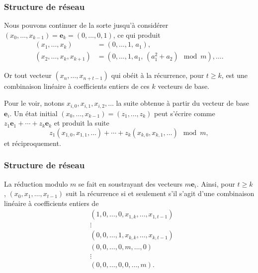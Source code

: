 \documentclass[t,usepdftitle=false]{beamer}
\def\be{\boldsymbol{e}}
\begin{document}
\begin{frame}
\frametitle{Structure de réseau}

Nous pouvons continuer de la sorte jusqu'à considérer
{$(x_0,\dots,x_{k-1}) = \be_k = (0,\dots,0,1)$}, ce qui produit
\begin{align*}
 (x_1,\dots,x_k) &= (0,\dots,1,\,a_1), \\ 
 (x_2,\dots,x_k, x_{k+1}) &= (0,\dots, 1, a_1,\, (a_1^2 + a_2)\mod m), \ldots.
 \end{align*}

\mbox{}

Or tout vecteur $(x_n,\dots,x_{n+t-1})$ qui obéit à la récurrence, 
pour $t\ge k$, est une combinaison linéaire à coefficients entiers de ces $k$ vecteurs de base.


\mbox{}

Pour le voir, notons ${x_{i,0}, x_{i,1}, x_{i,2},\dots}$ la suite
obtenue à partir du vecteur de base $\be_i$.
Un état initial $(x_0,\dots,x_{k-1}) = (z_1,\dots,z_k)$ peut
s'écrire comme $z_1 \be_1 + \cdots + z_k \be_k$ et produit la suite
\[
z_1 (x_{1,0}, x_{1,1}, \dots) + \cdots + 
 z_k (x_{k,0}, x_{k,1}, \dots) \mod m,
\]
et réciproquement.

\end{frame}

\begin{frame}
\frametitle{Structure de réseau}

La réduction modulo $m$ se fait en soustrayant des vecteurs $m\be_i$.
Ainsi, pour $t\ge k$, $(x_{0}, x_{1},\dots, x_{t-1})$ suit la récurrence
si et seulement s'il s'agit d'une combinaison linéaire à coefficients entiers de
\begin{eqnarray*}
 & (1,0,\dots,0, x_{1,k}, \dots, x_{1,t-1}) \\
 &  \vdots \\
 & (0,0,\dots,1, x_{k,k}, \dots, x_{k,t-1}) \\
 & (0,0,\dots,0, m, \dots, 0) \\
 &  \vdots \\
 & (0,0,\dots,0, 0, \dots, m).
\end{eqnarray*}

\end{frame}
\end{document}
